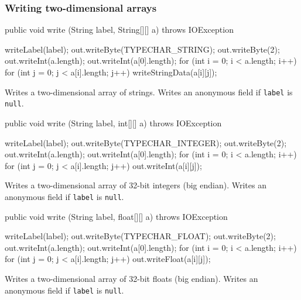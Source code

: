 \subsubsection*{Writing two-dimensional arrays}

\begin{code}

   public void write (String label, String[][] a) throws IOException \begin{hide} {
      writeLabel(label);
      out.writeByte(TYPECHAR_STRING);
      out.writeByte(2);
      out.writeInt(a.length);
      out.writeInt(a[0].length);
      for (int i = 0; i < a.length; i++)
         for (int j = 0; j < a[i].length; j++)
            writeStringData(a[i][j]);
   }
   \end{hide}
\end{code}
\begin{tabb}
Writes a two-dimensional array of strings.
Writes an anonymous field if \texttt{label} is \texttt{null}.
\end{tabb}
\begin{code}

   public void write (String label, int[][] a) throws IOException \begin{hide} {
      writeLabel(label);
      out.writeByte(TYPECHAR_INTEGER);
      out.writeByte(2);
      out.writeInt(a.length);
      out.writeInt(a[0].length);
      for (int i = 0; i < a.length; i++)
         for (int j = 0; j < a[i].length; j++)
            out.writeInt(a[i][j]);
   }
   \end{hide}
\end{code}
\begin{tabb}
Writes a two-dimensional array of 32-bit integers (big endian).
Writes an anonymous field if \texttt{label} is \texttt{null}.
\end{tabb}
\begin{code}

   public void write (String label, float[][] a) throws IOException \begin{hide} {
      writeLabel(label);
      out.writeByte(TYPECHAR_FLOAT);
      out.writeByte(2);
      out.writeInt(a.length);
      out.writeInt(a[0].length);
      for (int i = 0; i < a.length; i++)
         for (int j = 0; j < a[i].length; j++)
            out.writeFloat(a[i][j]);
   }
   \end{hide}
\end{code}
\begin{tabb}
Writes a two-dimensional array of 32-bit floats (big endian).
Writes an anonymous field if \texttt{label} is \texttt{null}.
\end{tabb}
